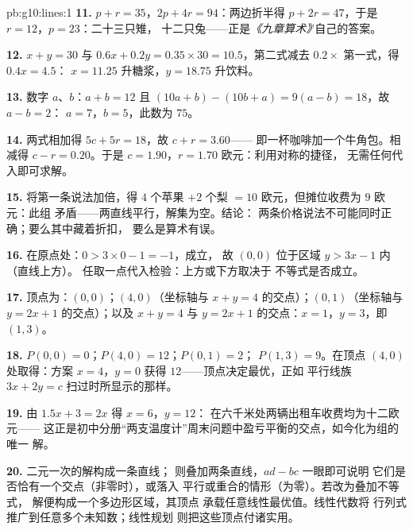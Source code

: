 \begin{solution}{pb:g10:lines:1}
\textbf{11.} $p + r = 35$，$2p + 4r = 94$：两边折半得
$p + 2r = 47$，于是 $r = 12$，$p = 23$：二十三只雉，
十二只兔——正是\emph{《九章算术》}'自己的答案。

\textbf{12.} $x + y = 30$ 与 $0.6x + 0.2y = 0.35 \times 30 =
10.5$，第二式减去 $0.2 \times$ 第一式，得 $0.4x = 4.5$：
$x = 11.25$ 升糖浆，$y = 18.75$ 升饮料。

\textbf{13.} 数字 $a$、$b$：$a + b = 12$ 且
$(10a + b) - (10b + a) = 9(a - b) = 18$，故 $a - b = 2$：
$a = 7$，$b = 5$，此数为 $75$。

\textbf{14.} 两式相加得 $5c + 5r = 18$，故 $c + r = 3.60$——
即一杯咖啡加一个牛角包。相减得 $c - r = 0.20$。于是
$c = 1.90$，$r = 1.70$ 欧元：利用对称的捷径，
无需任何代入即可求解。

\textbf{15.} 将第一条说法加倍，得 $4$ 个苹果 $+ 2$
个梨 $= 10$ 欧元，但摊位收费为 $9$ 欧元：此组
矛盾——两直线平行，解集为空。结论：
两条价格说法不可能同时正确；要么其中藏着折扣，
要么是算术有误。

\textbf{16.} 在原点处：$0 > 3 \times 0 - 1 = -1$，成立，
故 $(0,0)$ 位于区域 $y > 3x - 1$ 内（直线上方）。
任取一点代入检验：上方或下方取决于
不等式是否成立。

\textbf{17.} 顶点为：$(0, 0)$；$(4, 0)$（坐标轴与
$x + y = 4$ 的交点）；$(0, 1)$（坐标轴与 $y = 2x + 1$ 的交点）；以及
$x + y = 4$ 与 $y = 2x + 1$ 的交点：$x = 1$，$y = 3$，即 $(1, 3)$。

\textbf{18.} $P(0,0) = 0$；$P(4, 0) = 12$；$P(0, 1) = 2$；
$P(1, 3) = 9$。在顶点 $(4, 0)$ 处取得：方案
$x = 4$，$y = 0$ 获得 $12$——顶点决定最优，正如
平行线族 $3x + 2y = c$ 扫过时所显示的那样。

\textbf{19.} 由 $1.5x + 3 = 2x$ 得 $x = 6$，$y = 12$：
在六千米处两辆出租车收费均为十二欧元——
这正是初中分册“两支温度计”周末问题中盈亏平衡的交点，如今化为组的唯一
解。

\textbf{20.} 二元一次的解构成一条直线；
则叠加两条直线，$ad - bc$ 一眼即可说明
它们是否恰有一个交点（非零时），或落入
平行或重合的情形（为零）。若改为叠加不等式，
解便构成一个多边形区域，其顶点
承载任意线性最优值。线性代数将
行列式推广到任意多个未知数；线性规划
则把这些顶点付诸实用。
\end{solution}
